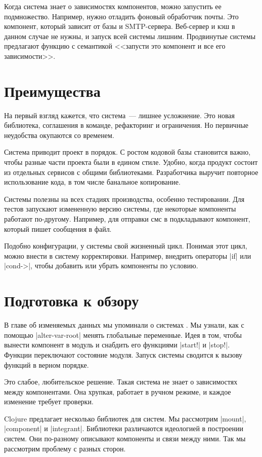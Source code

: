Когда система знает о зависимостях компонентов, можно запустить ее
подмножество. Например, нужно отладить фоновый обработчик почты. Это компонент,
который зависит от базы и SMTP-сервера. Веб-сервер и кэш в данном случае не
нужны, и запуск всей системы лишним. Продвинутые системы предлагают функцию с
семантикой <<запусти это компонент и все его зависимости>>.

\section{Преимущества}

На первый взгляд кажется, что система~--- лишнее усложнение. Это новая
библиотека, соглашения в команде, рефакторинг и ограничения. Но первичные
неудобства окупаются со временем.

Система приводит проект в порядок. С ростом кодовой базы становится важно, чтобы
разные части проекта были в едином стиле. Удобно, когда продукт состоит из
отдельных сервисов с общими библиотеками. Разработчика выручит повторное
использование кода, в том числе банальное копирование.

Системы полезны на всех стадиях производства, особенно тестировании. Для тестов
запускают измененную версию системы, где некоторые компоненты работают
по-другому. Например, для отправки смс в подкладывают компонент, который пишет
сообщения в файл.

Подобно конфигурации, у системы свой жизненный цикл. Понимая этот цикл, можно
внести в систему корректировки. Например, внедрить операторы \spverb|if| или
\spverb|cond->|, чтобы добавить или убрать компоненты по условию.

\section{Подготовка к обзору}

В главе об изменяемых данных мы упоминали о системах . Мы
узнали, как с помощью \spverb|alter-var-root| менять глобальные переменные. Идея
в том, чтобы вынести компонент в модуль и снабдить его функциями \spverb|start!|
и \spverb|stop!|. Функции переключают состояние модуля. Запуск системы сводится
к вызову функций в верном порядке.

Это слабое, любительское решение. Такая система не знает о зависимостях между
компонентами. Она хрупкая, работает в ручном режиме, и каждое изменение требует
проверки.

Clojure предлагает несколько библиотек для систем. Мы рассмотрим \spverb|mount|,
\spverb|component| и \spverb|integrant|. Библиотеки различаются идеологией в
построении систем. Они по-разному описывают компоненты и связи между ними. Так
мы рассмотрим проблему с разных сторон.

